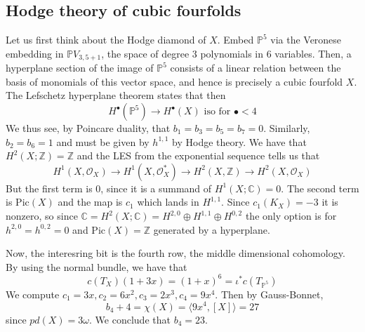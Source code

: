 



\subsection{Hodge theory of cubic fourfolds}

Let us first think about the Hodge diamond of $X$. Embed $\mathbb{P}^5$ via the Veronese embedding in $\mathbb{P}V_{3,5+1}$, the space of degree 3 polynomials in 6 variables. Then, a hyperplane section of the image of $\mathbb{P}^5$ consists of a linear relation between the basis of monomials of this vector space, and hence is precisely a cubic fourfold $X$. The Lefschetz hyperplane theorem states that then $$H^\bullet(\mathbb{P}^5)\xrightarrow{}H^\bullet (X) \text{ iso for }\bullet<4$$
We thus see, by Poincare duality, that $b_{1}=b_{3}=b_{5}=b_{7}=0$. Similarly, $b_{2}=b_{6}=1$ and must be given by $h^{1,1}$ by Hodge theory. We have that $H^2(X;\mathbb{Z})=\mathbb{Z}$ and the LES from the exponential sequence tells us that $$H^1(X,\mathcal{O}_{X})\xrightarrow{}H^1(X,\mathcal{O}_{X}^*)\xrightarrow{}H^2(X,\mathbb{Z})\xrightarrow{}H^2(X,\mathcal{O}_{X})$$
But the first term is 0, since it is a summand of $H^1(X;\mathbb{C})=0$. The second term is $\mathrm{Pic}(X)$ and the map is $c_1$ which lands in $H^{1,1}$. Since $c_1(K_X)=-3$ it is nonzero, so since $\mathbb{C}=H^2(X;\mathbb{C})=H^{2,0}\oplus H^{1,1}\oplus H^{0,2}$ the only option is for $h^{2,0}=h^{0,2}=0$ and $\mathrm{Pic}(X)=\mathbb{Z}$ generated by a hyperplane. 

Now, the interesring bit is the fourth row, the middle dimensional cohomology. By using the normal bundle, we have that $$c(T_{X})(1+3x)=(1+x)^6=\iota^* c(T_{\mathbb{P}^5})$$We compute $c_1=3x, c_2=6x^2, c_3=2x^3, c_4=9x^4$. Then by Gauss-Bonnet, $$b_{4}+4=\chi(X)=\langle 9x^4, [X] \rangle= 27 $$since $pd(X)=3\omega$. We conclude that $b_4=23$. 

